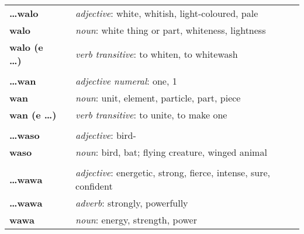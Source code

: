 \begin{supertabular}{p{2,5cm}|ll}
    \textbf{\dots walo}          &  & \textit{adjective}: white, whitish, light-coloured, pale                                                   \\
    \textbf{walo}                &  & \textit{noun}: white thing or part, whiteness, lightness                                                   \\
    \textbf{walo (e \dots)}      &  & \textit{verb transitive}: to whiten, to whitewash                                                          \\
                                 &  &                                                                                                            \\
    \textbf{\dots wan}           &  & \textit{adjective numeral}: one, 1                                                                         \\
    \textbf{wan}                 &  & \textit{noun}: unit, element, particle, part, piece                                                        \\
    \textbf{wan (e \dots)}       &  & \textit{verb transitive}: to unite, to make one                                                            \\
                                 &  &                                                                                                            \\
    \textbf{\dots waso}          &  & \textit{adjective}: bird-                                                                                  \\
    \textbf{waso}                &  & \textit{noun}: bird, bat; flying creature, winged animal                                                   \\
                                 &  &                                                                                                            \\
    \textbf{\dots wawa}          &  & \textit{adjective}: energetic, strong, fierce, intense, sure, confident                                    \\
    \textbf{\dots wawa}          &  & \textit{adverb}: strongly, powerfully                                                                      \\
    \textbf{wawa}                &  & \textit{noun}: energy, strength, power                                                                     \\

\end{supertabular}
